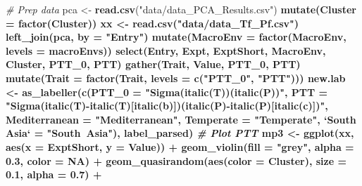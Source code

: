 \documentclass[
]{article}
\newenvironment{Shaded}{\begin{snugshade}}{\end{snugshade}}
\newcommand{\CommentTok}[1]{\textcolor[rgb]{0.56,0.35,0.01}{\textit{#1}}}
\newcommand{\DataTypeTok}[1]{\textcolor[rgb]{0.13,0.29,0.53}{#1}}
\newcommand{\DecValTok}[1]{\textcolor[rgb]{0.00,0.00,0.81}{#1}}
\newcommand{\FloatTok}[1]{\textcolor[rgb]{0.00,0.00,0.81}{#1}}
\newcommand{\KeywordTok}[1]{\textcolor[rgb]{0.13,0.29,0.53}{\textbf{#1}}}
\newcommand{\NormalTok}[1]{#1}
\newcommand{\OperatorTok}[1]{\textcolor[rgb]{0.81,0.36,0.00}{\textbf{#1}}}
\newcommand{\OtherTok}[1]{\textcolor[rgb]{0.56,0.35,0.01}{#1}}
\newcommand{\StringTok}[1]{\textcolor[rgb]{0.31,0.60,0.02}{#1}}
\begin{document}
\begin{Shaded}
\begin{Highlighting}[]
\CommentTok{# Prep data}
\NormalTok{pca <-}\StringTok{ }\KeywordTok{read.csv}\NormalTok{(}\StringTok{"data/data_PCA_Results.csv"}\NormalTok{) }\OperatorTok{%
\StringTok{  }\KeywordTok{mutate}\NormalTok{(}\DataTypeTok{Cluster =} \KeywordTok{factor}\NormalTok{(Cluster))}
\NormalTok{xx <-}\StringTok{ }\KeywordTok{read.csv}\NormalTok{(}\StringTok{"data/data_Tf_Pf.csv"}\NormalTok{) }\OperatorTok{%
\StringTok{  }\KeywordTok{left_join}\NormalTok{(pca, }\DataTypeTok{by =} \StringTok{"Entry"}\NormalTok{) }\OperatorTok{%
\StringTok{  }\KeywordTok{mutate}\NormalTok{(}\DataTypeTok{MacroEnv =} \KeywordTok{factor}\NormalTok{(MacroEnv, }\DataTypeTok{levels =}\NormalTok{ macroEnvs)) }\OperatorTok{%
\StringTok{  }\KeywordTok{select}\NormalTok{(Entry, Expt, ExptShort, MacroEnv, Cluster, PTT_}\DecValTok{0}\NormalTok{, PTT) }\OperatorTok{%
\StringTok{  }\KeywordTok{gather}\NormalTok{(Trait, Value, PTT_}\DecValTok{0}\NormalTok{, PTT) }\OperatorTok{%
\StringTok{  }\KeywordTok{mutate}\NormalTok{(}\DataTypeTok{Trait =} \KeywordTok{factor}\NormalTok{(Trait, }\DataTypeTok{levels =} \KeywordTok{c}\NormalTok{(}\StringTok{"PTT_0"}\NormalTok{, }\StringTok{"PTT"}\NormalTok{)))}
\NormalTok{new.lab <-}\StringTok{ }\KeywordTok{as_labeller}\NormalTok{(}\KeywordTok{c}\NormalTok{(}\DataTypeTok{PTT_0 =} \StringTok{"Sigma(italic(T))(italic(P))"}\NormalTok{,}
  \DataTypeTok{PTT =} \StringTok{"Sigma(italic(T)-italic(T)[italic(b)])(italic(P)-italic(P)[italic(c)])"}\NormalTok{, }
  \DataTypeTok{Mediterranean =} \StringTok{"Mediterranean"}\NormalTok{, }\DataTypeTok{Temperate =} \StringTok{"Temperate"}\NormalTok{, }
  \StringTok{`}\DataTypeTok{South Asia}\StringTok{`}\NormalTok{ =}\StringTok{ "South~Asia"}\NormalTok{), label_parsed)}
\CommentTok{# Plot PTT}
\NormalTok{mp3 <-}\StringTok{ }\KeywordTok{ggplot}\NormalTok{(xx, }\KeywordTok{aes}\NormalTok{(}\DataTypeTok{x =}\NormalTok{ ExptShort, }\DataTypeTok{y =}\NormalTok{ Value)) }\OperatorTok{+}
\StringTok{  }\KeywordTok{geom_violin}\NormalTok{(}\DataTypeTok{fill =} \StringTok{"grey"}\NormalTok{, }\DataTypeTok{alpha =} \FloatTok{0.3}\NormalTok{, }\DataTypeTok{color =} \OtherTok{NA}\NormalTok{) }\OperatorTok{+}\StringTok{ }
\StringTok{  }\KeywordTok{geom_quasirandom}\NormalTok{(}\KeywordTok{aes}\NormalTok{(}\DataTypeTok{color =}\NormalTok{ Cluster), }\DataTypeTok{size =} \FloatTok{0.1}\NormalTok{, }\DataTypeTok{alpha =} \FloatTok{0.7}\NormalTok{) }\OperatorTok{+}\StringTok{ }
}}}}}}
\end{Highlighting}
\end{Shaded}
\end{document}
